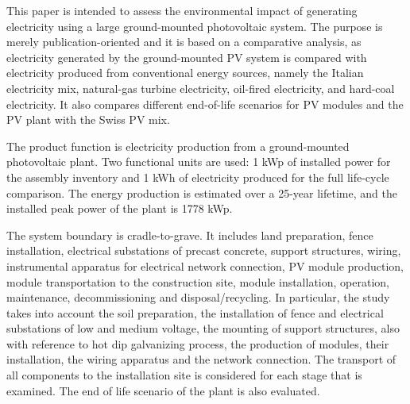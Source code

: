 \documentclass[9pt]{extarticle}
\begin{document}
This paper is intended to assess the environmental impact of
generating electricity using a large ground-mounted photovoltaic
system. The purpose is merely publication-oriented and it is based
on a comparative analysis, as electricity generated by the
ground-mounted PV system is compared with electricity produced
from conventional energy sources, namely the Italian electricity
mix, natural-gas turbine electricity, oil-fired electricity, and
hard-coal electricity. It also compares different end-of-life
scenarios for PV modules and the PV plant with the Swiss PV mix.

The product function is electricity production from a ground-mounted
photovoltaic plant. Two functional units are used: 1 kWp of
installed power for the assembly inventory and 1 kWh of electricity
produced for the full life-cycle comparison. The energy production
is estimated over a 25-year lifetime, and the installed peak power
of the plant is 1778 kWp.

The system boundary is cradle-to-grave. It includes land preparation,
fence installation, electrical substations of precast concrete,
support structures, wiring, instrumental apparatus for electrical
network connection, PV module production, module transportation to
the construction site, module installation, operation, maintenance,
decommissioning and disposal/recycling.
In particular, the study takes into account the soil preparation, the
installation of fence and electrical substations of low and medium
voltage, the mounting of support structures, also with reference to
hot dip galvanizing process, the production of modules, their
installation, the wiring apparatus and the network connection. The
transport of all components to the installation site is considered
for each stage that is examined. The end of life scenario of the
plant is also evaluated.
\end{document}

